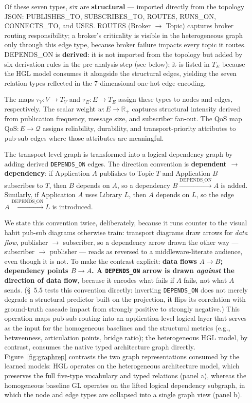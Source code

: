 \documentclass[review]{elsarticle}
\begin{document}
Of these seven types, six are \textbf{structural} --- imported directly from the topology JSON:
PUBLISHES\_TO, SUBSCRIBES\_TO, ROUTES, RUNS\_ON, CONNECTS\_TO, and USES. ROUTES (Broker
$\to$ Topic) captures broker routing responsibility; a broker's criticality is visible in the
heterogeneous graph only through this edge type, because broker failure impacts every topic it
routes. DEPENDS\_ON is \textbf{derived}: it is not imported from the topology but added by six
derivation rules in the pre-analysis step (see below); it is listed in $T_E$ because the HGL model
consumes it alongside the structural edges, yielding the seven relation types reflected in the
7-dimensional one-hot edge encoding.

The maps $\tau_V : V \to T_V$ and $\tau_E : E \to T_E$ assign these types to nodes and edges,
respectively. The scalar weight $w:E\to\mathbb{R}_+$ captures structural intensity derived from
publication frequency, message size, and subscriber fan-out. The QoS map
$\text{QoS}:E\to\mathcal{Q}$ assigns reliability, durability, and transport-priority attributes to
pub-sub edges where those attributes are meaningful.

The transport-level graph is transformed into a logical dependency graph by adding derived
\texttt{DEPENDS\_ON} edges. The direction convention is \textbf{dependent $\to$ dependency}: if
Application $A$ publishes to Topic $T$ and Application $B$ subscribes to $T$, then $B$ depends on
$A$, so a dependency $B \xrightarrow{\text{DEPENDS\_ON}} A$ is added. Similarly, if Application $A$
uses Library $L$, then $A$ depends on $L$, so the edge $A \xrightarrow{\text{DEPENDS\_ON}} L$ is
introduced.

We state this convention twice, deliberately, because it runs counter to the visual habit pub-sub
diagrams otherwise train: transport diagrams draw arrows for \emph{data flow}, publisher $\to$
subscriber, so a dependency arrow drawn the other way --- subscriber $\to$ publisher --- reads as
reversed to a middleware-literate audience, even though it is not. To make the contrast explicit:
\textbf{data flows $A \to B$; dependency points $B \to A$. A \texttt{DEPENDS\_ON} arrow is drawn
\emph{against} the direction of data flow}, because it encodes what fails if $A$ fails, not what $A$
sends. (\S~5.5 tests this convention directly: inverting \texttt{DEPENDS\_ON} does not merely
degrade a structural predictor built on the projection, it flips its correlation with ground-truth
cascade impact from strongly positive to strongly negative.) This operation maps pub-sub routing
into an application-level logical layer that serves as the input for the homogeneous baselines and
the structural metrics (e.g., betweenness, articulation points, bridge ratio); the heterogeneous HGL
model, by contrast, consumes the native typed architecture graph directly. Figure~\ref{fig:graphrep}
contrasts the two graph representations consumed by the learned models: HGL operates on the
heterogeneous architecture model, which preserves the full five-type vocabulary and typed relations
(panel a), whereas the homogeneous baseline GL operates on the lifted logical dependency subgraph,
in which the node and edge types are collapsed into a single graph view (panel b).
\end{document}
